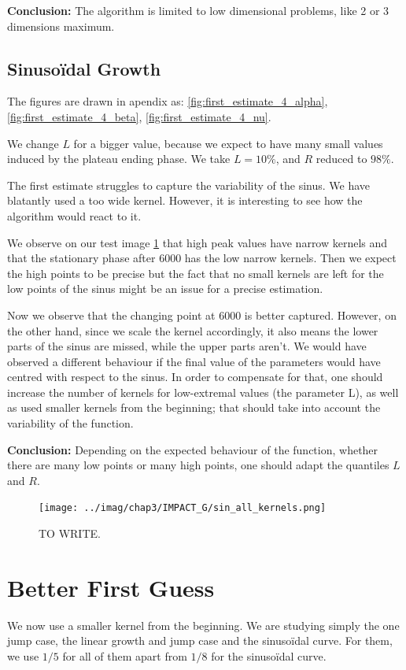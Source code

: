 \documentclass[11pt]{book}
\begin{document}
\textbf{Conclusion:} The algorithm is limited to low dimensional problems, like 2 or 3 dimensions maximum.

\subsection{Sinusoïdal Growth}
The figures are drawn in apendix as: \ref{fig:first_estimate_4_alpha}, \ref{fig:first_estimate_4_beta}, \ref{fig:first_estimate_4_nu}.

We change $L$ for a bigger value, because we expect to have many small values induced by the plateau ending phase. We take $L=10\%$, and $R$ reduced to $98\%$.

The first estimate struggles to capture the variability of the sinus. We have blatantly used a too wide kernel. However, it is interesting to see how the algorithm would react to it.

We observe on our test image \ref{fig:impact_g_sin} that high peak values have narrow kernels and that the stationary phase after 6000 has the low narrow kernels. Then we expect the high points to be precise but the fact that no small kernels are left for the low points of the sinus might be an issue for a precise estimation.



Now we observe that the changing point at 6000 is better captured. However, on the other hand, since we scale the kernel accordingly, it also means the lower parts of the sinus are missed, while the upper parts aren't. We would have observed a different behaviour if the final value of the parameters would have centred with respect to the sinus. In order to compensate for that, one should increase the number of kernels for low-extremal values (the parameter 	L), as well as used smaller kernels from the beginning; that should take into account the variability of the function.

\textbf{Conclusion:} Depending on the expected behaviour of the function, whether there are many low points or many high points, one should adapt the quantiles $L$ and $R$.


\begin{figure}
\centering
\texttt{[image: ../imag/chap3/IMPACT\_G/sin\_all\_kernels.png]}
\caption{TO WRITE.}
\label{fig:impact_g_sin}
\end{figure}




\section{Better First Guess}
\label{section_second_simul}
We now use a smaller kernel from the beginning. We are studying simply the one jump case, the linear growth and jump case and the sinusoïdal curve. For them, we use $1/5$ for all of them apart from $1/8$ for the sinusoïdal curve. 
\end{document}
